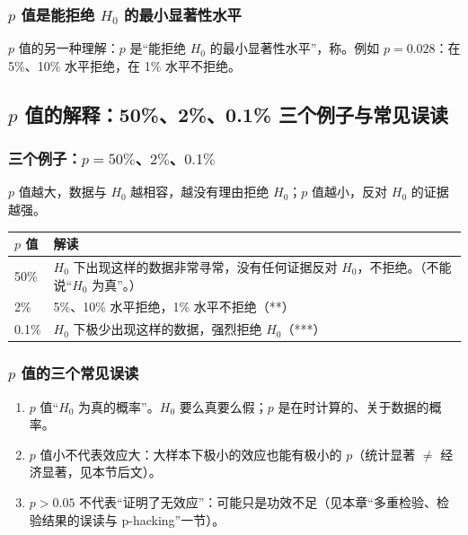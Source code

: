 \subsubsection{\texorpdfstring{$p$}{p} 值是能拒绝 \texorpdfstring{$H_0$}{H0} 的最小显著性水平}

$p$ 值的另一种理解：$p$ 是“能拒绝 $H_0$ 的最小显著性水平”，称。例如 $p=0.028$：在 5\%、10\% 水平拒绝，在 1\% 水平不拒绝。

\subsection{\texorpdfstring{$p$}{p} 值的解释：50\%、2\%、0.1\% 三个例子与常见误读}

\subsubsection{三个例子：\texorpdfstring{$p=50\%$、$2\%$、$0.1\%$}{p = 50\%, 2\%, 0.1\%}}

$p$ 值越大，数据与 $H_0$ 越相容，越没有理由拒绝 $H_0$；$p$ 值越小，反对 $H_0$ 的证据越强。
\begin{center}
\small
\begin{tabularx}{\linewidth}{@{}l L@{}}
\toprule
$p$ 值 & 解读\\
\% & $H_0$ 下出现这样的数据非常寻常，没有任何证据反对 $H_0$，不拒绝。（不能说“$H_0$ 为真”。）\\
2\% & 5\%、10\% 水平拒绝，1\% 水平不拒绝（**）\\
0.1\% & $H_0$ 下极少出现这样的数据，强烈拒绝 $H_0$（***）\\
\bottomrule
\end{tabularx}
\end{center}

\subsubsection{\texorpdfstring{$p$}{p} 值的三个常见误读}

\begin{note}[$p$ 值的三个常见误读]
\begin{enumerate}
  \item $p$ 值“$H_0$ 为真的概率”。$H_0$ 要么真要么假；$p$ 是在时计算的、关于数据的概率。
  \item $p$ 值小不代表效应大：大样本下极小的效应也能有极小的 $p$（统计显著 $\ne$ 经济显著，见本节后文）。
  \item $p>0.05$ 不代表“证明了无效应”：可能只是功效不足（见本章“多重检验、检验结果的误读与 p-hacking”一节）。
\end{enumerate}
\end{note}

